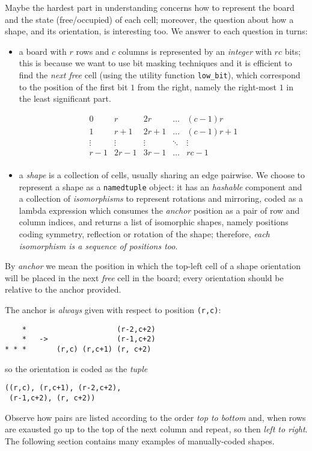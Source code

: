 Maybe the hardest part in understanding concerns how to represent the board and
the state (free/occupied) of each cell; moreover, the question about how a
shape, and its orientation, is interesting too. We answer to each question in
turns:
\begin{itemize}
    \item a board with $r$ rows and $c$ columns is represented by an
    \textit{integer} with $rc$ bits; this is because we want to use bit masking
    techniques and it is efficient to find the \textit{next free} cell (using
    the utility function \verb|low_bit|), which correspond to the position of
    the first bit $1$ from the right, namely the right-most $1$ in the least
    significant part.
    \begin{margintable}[-2cm]
        \begin{displaymath}
        \begin{array}{c|c|c|c|c}
        0 & r & 2r & \ldots & (c-1)r \\
        \hline
        1 & r+1 & 2r+1 & \ldots & (c-1)r+1 \\
        \hline
        \vdots & \vdots & \vdots & \ddots & \vdots \\
        \hline
        r-1 & 2r-1 & 3r-1 & \ldots & rc-1\\
        \end{array}
        \end{displaymath}
    \end{margintable}

    \item a \textit{shape} is a collection of cells, usually sharing an edge
    pairwise. We choose to represent a shape as a \verb|namedtuple| object: it
    has an \textit{hashable} component and a collection of
    \textit{isomorphisms} to represent rotations and mirroring, coded as a
    lambda expression which consumes the \textit{anchor} position as a pair of row
    and column indices, and returns a list of isomorphic shapes, namely
    positions coding symmetry, reflection or rotation of the shape; therefore,
    \textit{each isomorphism is a sequence of positions too}.
\end{itemize}
By \textit{anchor} we mean the position in which the top-left cell of a shape
orientation will be placed in the next \textit{free} cell in the board; every
orientation should be relative to the anchor provided.
\begin{margintable}
The anchor is \textit{always} given with respect to position \verb|(r,c)|:
\begin{verbatim}
    *                     (r-2,c+2)
    *   ->                (r-1,c+2)
* * *       (r,c) (r,c+1) (r, c+2)
\end{verbatim}
so the orientation is coded as the \textit{tuple}
\begin{verbatim}
((r,c), (r,c+1), (r-2,c+2),
 (r-1,c+2), (r, c+2))
\end{verbatim}
\end{margintable}
Observe how pairs are listed according to the order \textit{top to bottom} and,
when rows are exausted go up to the top of the next column and repeat, so then
\textit{left to right}.  The following section contains many examples of
manually-coded shapes.

